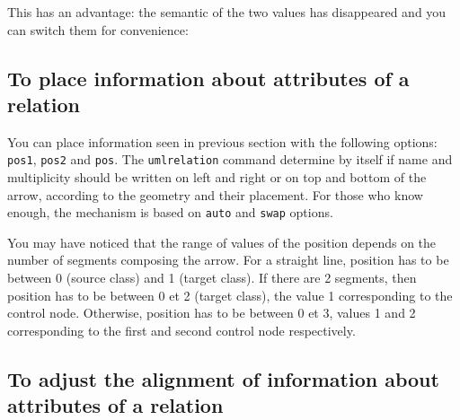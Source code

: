 \documentclass[a4paper,11pt]{report}
\begin{document}
\medskip

This has an advantage: the semantic of the two values has disappeared and you can switch them for convenience:

\medskip

\begin{minipage}{0.5\textwidth}
	
\end{minipage}
\begin{minipage}{0.4\textwidth}
	\begin{center}
	\end{center}
\end{minipage}

\medskip

\subsection{To place information about attributes of a relation}\label{ss.relposattr}

You can place information seen in previous section with the following options: {\tt pos1}, {\tt pos2} and {\tt pos}.
The {\tt umlrelation} command determine by itself if name and multiplicity should be written on left and right or on top and bottom of the arrow, according to the geometry and their placement. For those who know \TikZ enough, the mechanism is based on {\tt auto} and {\tt swap} options.

\medskip

\begin{minipage}{0.5\textwidth}
	
\end{minipage}
\begin{minipage}{0.4\textwidth}
	\begin{center}
	\end{center}
\end{minipage}

\medskip

You may have noticed that the range of values of the position depends on the number of segments composing the arrow. For a straight line, position has to be between  0 (source class) and 1 (target class). If there are 2 segments, then position has to be between 0 et 2 (target class), the value 1 corresponding to the control node. Otherwise, position has to be between 0 et 3, values 1 and 2 corresponding to the first and second control node respectively.

\subsection{To adjust the alignment of information about attributes of a relation}\label{ss.relalign}
\end{document}

